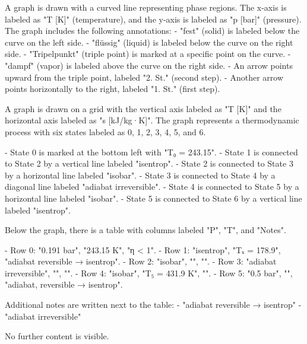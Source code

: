 A graph is drawn with a curved line representing phase regions. The x-axis is labeled as "T [K]" (temperature), and the y-axis is labeled as "p [bar]" (pressure). The graph includes the following annotations:  
- "fest" (solid) is labeled below the curve on the left side.  
- "flüssig" (liquid) is labeled below the curve on the right side.  
- "Tripelpunkt" (triple point) is marked at a specific point on the curve.  
- "dampf" (vapor) is labeled above the curve on the right side.  
- An arrow points upward from the triple point, labeled "2. St." (second step).  
- Another arrow points horizontally to the right, labeled "1. St." (first step).

A graph is drawn on a grid with the vertical axis labeled as "T [K]" and the horizontal axis labeled as "s [kJ/kg·K]". The graph represents a thermodynamic process with six states labeled as 0, 1, 2, 3, 4, 5, and 6.  

- State 0 is marked at the bottom left with "T₀ = 243.15".  
- State 1 is connected to State 2 by a vertical line labeled "isentrop".  
- State 2 is connected to State 3 by a horizontal line labeled "isobar".  
- State 3 is connected to State 4 by a diagonal line labeled "adiabat irreversible".  
- State 4 is connected to State 5 by a horizontal line labeled "isobar".  
- State 5 is connected to State 6 by a vertical line labeled "isentrop".  

Below the graph, there is a table with columns labeled "P", "T", and "Notes".  

- Row 0: "0.191 bar", "243.15 K", "η < 1".  
- Row 1: "isentrop", "Tₛ = 178.9", "adiabat reversible → isentrop".  
- Row 2: "isobar", "", "".  
- Row 3: "adiabat irreversible", "", "".  
- Row 4: "isobar", "T₅ = 431.9 K", "".  
- Row 5: "0.5 bar", "", "adiabat, reversible → isentrop".  

Additional notes are written next to the table:  
- "adiabat reversible → isentrop"  
- "adiabat irreversible"  

No further content is visible.